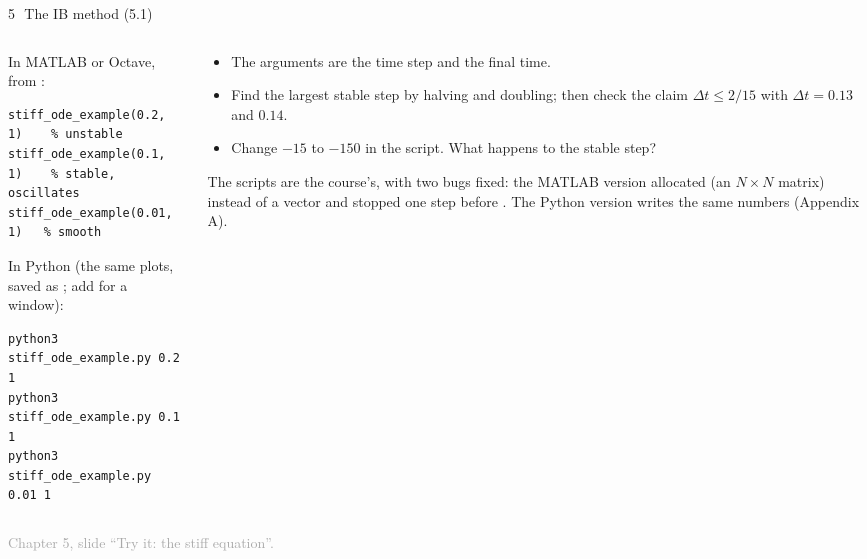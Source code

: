 \documentclass[aspectratio=169,11pt]{beamer}
\newcommand{\sourcecredit}[1]{\vfill\begin{flushright}\tiny\textcolor{DarkGray}{#1}\end{flushright}}
\begin{document}
\begin{frame}[fragile]{5\,\textbullet\ The IB method (5.1)}
\label{fr:c5x1}
\begin{columns}[T,onlytextwidth]
\begin{column}{0.5\textwidth}
In MATLAB or Octave, from :
\begin{lstlisting}[style=matlab]
stiff_ode_example(0.2, 1)    % unstable
stiff_ode_example(0.1, 1)    % stable, oscillates
stiff_ode_example(0.01, 1)   % smooth
\end{lstlisting}
In Python (the same plots, saved as ; add  for a window):
\begin{lstlisting}[style=shell]
python3 stiff_ode_example.py 0.2 1
python3 stiff_ode_example.py 0.1 1
python3 stiff_ode_example.py 0.01 1
\end{lstlisting}
\end{column}
\begin{column}{0.48\textwidth}
\begin{itemize}
  \item The arguments are the time step and the final time.
  \item Find the largest stable step by halving and doubling; then check the claim $\Delta t \le 2/15$ with $\Delta t = 0.13$ and $0.14$.
  \item Change $-15$ to $-150$ in the script. What happens to the stable step?
\end{itemize}
\begin{punchbox}
\small The scripts are the course's, with two bugs fixed: the MATLAB version allocated  (an $N\times N$ matrix) instead of a vector and stopped one step before . The Python version writes the same numbers (Appendix A).
\end{punchbox}
\end{column}
\end{columns}
\sourcecredit{Chapter 5, slide ``Try it: the stiff equation''.}
\end{frame}
\end{document}
